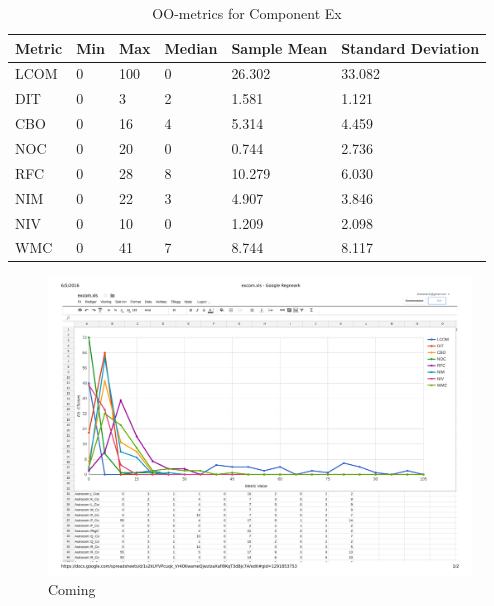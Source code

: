 \begin{table}[]
\centering
\caption{OO-metrics for Component Ex}
\label{tab:oometrics-ex}
\begin{tabular}{|l|l|l|l|l|l|}
\hline
\textbf{Metric} & \textbf{Min} & \textbf{Max} & \textbf{Median} & \textbf{Sample Mean} & \textbf{Standard Deviation} \\ \hline
LCOM            & 0           & 100          & 0               & 26.302               & 33.082                      \\ \hline
DIT             & 0            & 3            & 2               & 1.581                & 1.121                       \\ \hline
CBO             & 0            & 16           & 4               & 5.314                & 4.459                       \\ \hline
NOC             & 0            & 20           & 0               & 0.744                & 2.736                       \\ \hline
RFC             & 0            & 28           & 8               & 10.279               & 6.030                       \\ \hline
NIM             & 0            & 22           & 3               & 4.907                & 3.846                       \\ \hline
NIV             & 0            & 10           & 0               & 1.209                & 2.098                       \\ \hline
WMC            & 0            & 41          & 7              & 8.744                 & 8.117                      \\ \hline
\end{tabular}
\end{table}


\begin{landscape}
\setlength\LTleft{-.5in}
	\begin{figure}
	\centering
	\includegraphics[width=\textwidth]{images/pdf/ex.pdf}
	\caption{Coming}
	\label{fig:exgraph}
	\end{figure}
\end{landscape}



